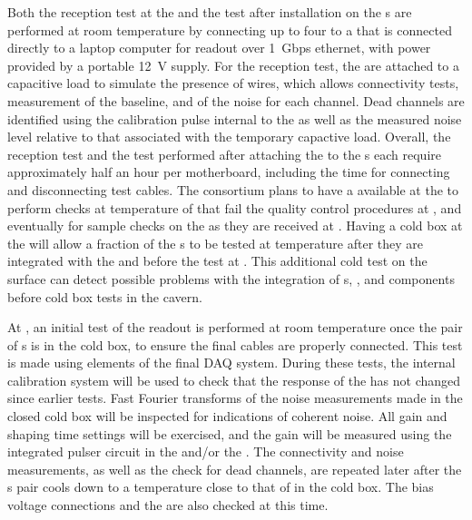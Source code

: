 Both the reception test at the  and the test after 
installation on the s are performed at room temperature 
by connecting up to four  to a  that is 
connected directly to a laptop computer for readout over 1~Gbps
ethernet, with power provided by a portable 12~V supply. For 
the reception test, the  are attached to a capacitive 
load to simulate the presence of wires, which allows connectivity 
tests, measurement of the baseline, and \rms of the noise for 
each channel. Dead channels are identified using the calibration 
pulse internal to the   as well as the measured
noise level relative to that associated with the temporary capactive load.
Overall, the reception test and the test performed after attaching the
 to the s each require approximately half an hour per
motherboard, including  the time for connecting and disconnecting test cables.
The  consortium plans to have a  available
at the  to perform checks at \lntwo temperature
of  that fail the quality control procedures at ,
and eventually for sample checks on the  as they are received
at . Having a cold box at the 
will allow a fraction of the s to be tested at
\lntwo temperature after they are integrated with the 
and  before the test at 
. This additional cold test on the surface can
detect possible problems with the integration of s, ,
and  components before cold
box tests in the  cavern.

At , an initial test of the readout is performed at room temperature
once the pair of s is in the cold box, to ensure the final cables are
properly connected. This test is made using elements of the final DAQ system.  During
these tests, the internal calibration system will be used to check that the response
of the  has not changed since earlier tests. Fast Fourier transforms of
the noise measurements made in the closed cold box will be inspected for indications
of coherent noise. All  gain and shaping time settings will be exercised,
and the gain will be measured using the integrated pulser circuit in the 
 and/or the . The connectivity and noise measurements, as well
as the check for dead channels, are repeated later after the s pair cools
down to a temperature close to that of \lntwo in the cold box. The bias voltage
connections and the  are also checked at this time.

